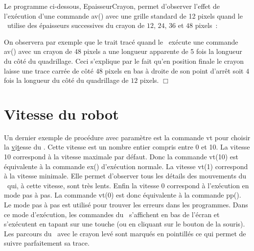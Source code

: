 \begin{exemple}{\rm
Le programme ci-dessous, {\idt EpaisseurCrayon}, permet d'observer
 l'effet de l'exécution d'une commande {\idt av()} avec une grille
 standard de 12 pixels quand le \robot\ utilise des épaisseurs
 successives du crayon de $12$, $24$, $36$ et $48$
 pixels~:\par\nopagebreak
\noindent\begin{minipage}[t][6.4cm][t]{\linewidth}
\vspace*{6cm}%
%
\vspace*{-6cm}%

\end{minipage}
On observera par exemple que le trait tracé quand le \robot\ exécute
une commande {\idt av()} avec un crayon de 48 pixels a une longueur
apparente de 5 fois la longueur du côté du quadrillage.  Ceci
s'explique par le fait qu'en position finale le crayon laisse une
trace carrée de côté $48$ pixels en bas à droite de son point d'arrêt
soit $4$ fois la longueur du côté du quadrillage de $12$ pixels. 
$\Box$ }%
\end{exemple}

\section{Vitesse du robot}

Un dernier exemple de procédure avec paramètre est la commande {\idt vt} pour choisir
la \underline{v}i\underline{t}esse du \robot. Cette vitesse est un nombre entier compris entre
0 et 10. La vitesse 10 correspond à la vitesse maximale par défaut. Donc la commande {\idt vt(10)}
est équivalente à la commande {\idt ex()} d'exécution normale. La vitesse
{\idt vt(1)} correspond à la vitesse minimale. Elle permet d'observer tous les détails des
mouvements du \robot\ qui, à cette vitesse, sont très lents. Enfin la vitesse  0
correspond à l'exécution en mode pas à pas. La commande {\idt vt(0)} est donc équivalente
à la commande {\idt pp()}. Le mode pas à pas est utilisé pour trouver les erreurs dans les
programmes. Dans ce mode d'exécution, les commandes du \robot\ s'affichent en bas de l'écran
et s'exécutent en tapant sur une touche (ou en cliquant sur le bouton de la souris). Les parcours
du \robot\ avec le crayon levé sont marqués en pointillés ce qui permet de suivre 
parfaitement sa trace.

